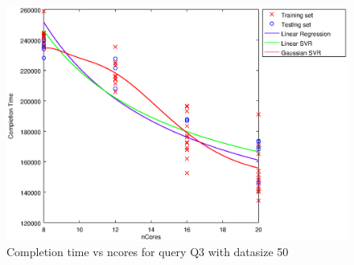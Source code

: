 
\begin {figure}[hbtp]
\centering
\includegraphics[width=\textwidth]{output/Q3_50_ONLY_1_OVER_NCORES/plot_Q3_50_bestmodels.eps}
\caption{Completion time vs ncores for query Q3 with datasize 50}
\label{fig:all_linear_Q3_50}
\end {figure}

